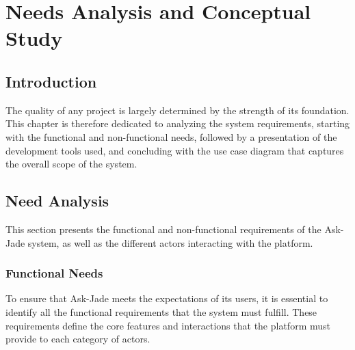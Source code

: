 \chapter{Needs Analysis and Conceptual Study}
\section{Introduction}
The quality of any project is largely determined by the strength of its foundation. This chapter is therefore dedicated to analyzing the system requirements, starting with the functional and non-functional needs, followed by a presentation of the development tools used, and concluding with the use case diagram that captures the overall scope of the system.

\section{Need Analysis}
This section presents the functional and non-functional requirements of the Ask-Jade system, as well as the different actors interacting with the platform.

\subsection{Functional Needs}
To ensure that Ask-Jade meets the expectations of its users, it is essential to identify all the functional requirements that the system must fulfill. These requirements define the core features and interactions that the platform must provide to each category of actors.

